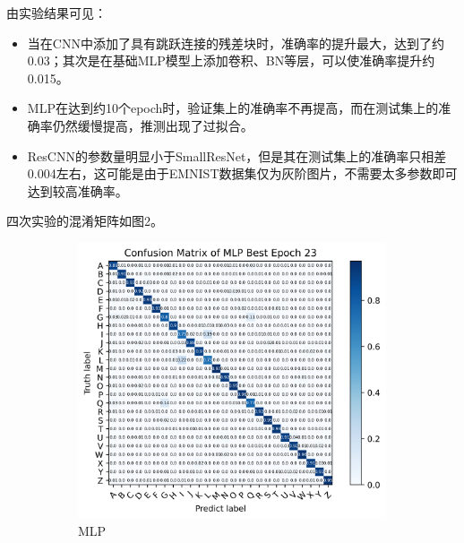 \documentclass{article}
\begin{document}
由实验结果可见：
\begin{itemize}
\item 当在CNN中添加了具有跳跃连接的残差块时，准确率的提升最大，达到了约0.03；其次是在基础MLP模型上添加卷积、BN等层，可以使准确率提升约0.015。
\item MLP在达到约10个epoch时，验证集上的准确率不再提高，而在测试集上的准确率仍然缓慢提高，推测出现了过拟合。
\item ResCNN的参数量明显小于SmallResNet，但是其在测试集上的准确率只相差0.004左右，这可能是由于EMNIST数据集仅为灰阶图片，不需要太多参数即可达到较高准确率。
\end{itemize}

四次实验的混淆矩阵如图2。
\begin{figure}[!ht]
    \centering
    \begin{subfigure}{0.45\textwidth}
        \centering
        \includegraphics[width=\linewidth]{confusion_matrix_mlp.png}
        \caption{MLP}
        \label{fig:sub1}
    \end{subfigure}
    \hfill
    \begin{subfigure}{0.45\textwidth}
        \centering

\end{subfigure}
\end{figure}
\end{document}
